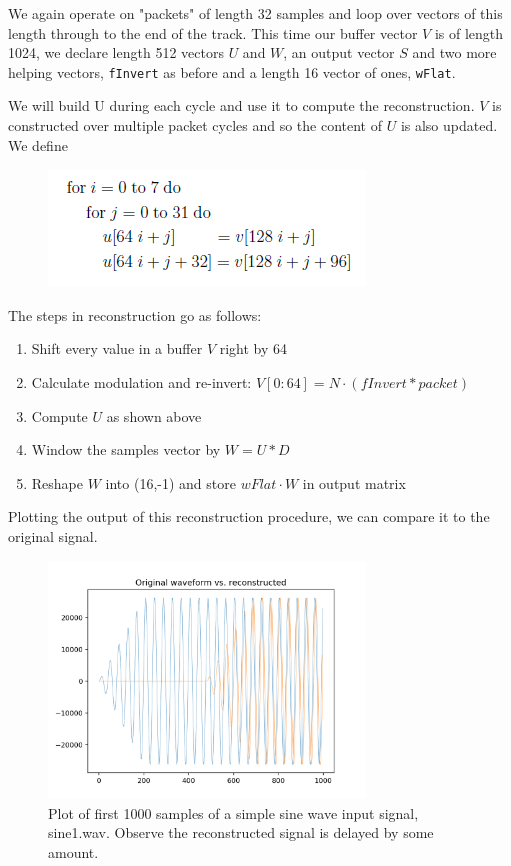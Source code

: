 \documentclass[11pt,a4paper]{article}
\begin{document}
We again operate on "packets" of length 32 samples and loop over vectors of this length through to the end of the track. This time our buffer vector $V$ is of length 1024, we declare length 512 vectors $U$ and $W$, an output vector $S$ and two more helping vectors, \verb|fInvert| as before and a length 16 vector of ones, \verb|wFlat|.

We will build U during each cycle and use it to compute the reconstruction. $V$ is constructed over multiple packet cycles and so the content of $U$ is also updated. We define

\begin{figure}[ht]
	\centering
	\includegraphics[scale=1]{synthesis/u_vect}
\end{figure}

The steps in reconstruction go as follows:

\begin{enumerate}
\item Shift every value in a buffer $V$ right by 64
\item Calculate modulation and re-invert: $V[0:64] = N \cdot (fInvert * packet)$
\item Compute $U$ as shown above
\item Window the samples vector by $W = U * D$
\item Reshape $W$ into (16,-1) and store $wFlat \cdot W$ in output matrix
\end{enumerate}

\pagebreak

Plotting the output of this reconstruction procedure, we can compare it to the original signal.

\begin{figure}[ht]
	\centering
	\includegraphics[width=0.75\textwidth]{synthesis/sine1_delay}
	\caption{Plot of first 1000 samples of a simple sine wave input signal, sine1.wav. Observe the reconstructed signal is delayed by some amount.}
	\label{fig:delay}
\end{figure}
\end{document}
